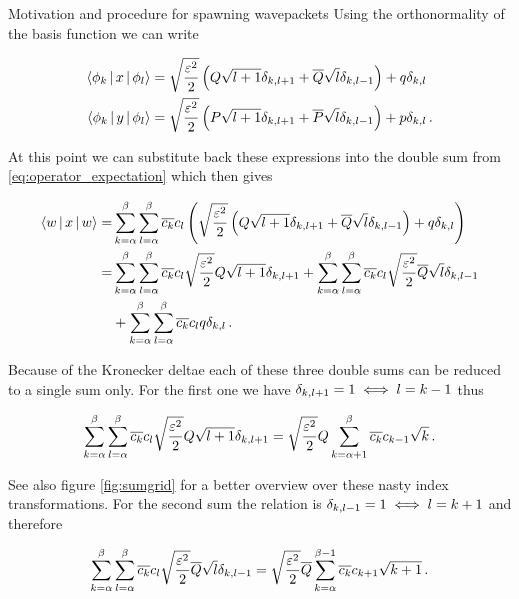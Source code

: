 \begin{chapter}{Motivation and procedure for spawning wavepackets}
Using the orthonormality of the basis function we can write

\begin{align}
  \Braket{\phi_k | x | \phi_l}
  & = \sqrt{\frac{\varepsilon^2}{2}} \left( Q \sqrt{l+1} \delta_{k,l+1}
    + \overline{Q} \sqrt{l} \delta_{k,l-1} \right)
    + q \delta_{k,l} \\
  \Braket{\phi_k | y | \phi_l}
  & = \sqrt{\frac{\varepsilon^2}{2}} \left( P \sqrt{l+1} \delta_{k,l+1}
    + \overline{P} \sqrt{l} \delta_{k,l-1} \right)
    + p \delta_{k,l} \,.
\end{align}

At this point we can substitute back these expressions into the double sum from
\eqref{eq:operator_expectation} which then gives

\begin{equation*}
\begin{split}
  \Braket{w | x | w} = & \sum_{k=\alpha}^\beta \sum_{l=\alpha}^\beta \overline{c_k} c_l
                         \left( \sqrt{\frac{\varepsilon^2}{2}} \left( Q \sqrt{l+1} \delta_{k,l+1}
                         + \overline{Q} \sqrt{l} \delta_{k,l-1} \right) + q \delta_{k,l} \right) \\
  = &   \sum_{k=\alpha}^\beta \sum_{l=\alpha}^\beta \overline{c_k} c_l \sqrt{\frac{\varepsilon^2}{2}} Q \sqrt{l+1} \delta_{k,l+1}
      + \sum_{k=\alpha}^\beta \sum_{l=\alpha}^\beta \overline{c_k} c_l \sqrt{\frac{\varepsilon^2}{2}} \overline{Q} \sqrt{l} \delta_{k,l-1} \\
    & + \sum_{k=\alpha}^\beta \sum_{l=\alpha}^\beta \overline{c_k} c_l q \delta_{k,l} \,.
\end{split}
\end{equation*}

Because of the Kronecker deltae each of these three double sums can be reduced
to a single sum only. For the first one we have $\delta_{k,l+1} = 1 \iff l = k-1$
thus

\begin{equation} \label{eq:part1}
  \sum_{k=\alpha}^\beta \sum_{l=\alpha}^\beta \overline{c_k} c_l \sqrt{\frac{\varepsilon^2}{2}} Q \sqrt{l+1} \delta_{k,l+1}
  = \sqrt{\frac{\varepsilon^2}{2}} Q \sum_{k=\alpha+1}^\beta \overline{c_k} c_{k-1} \sqrt{k} \,.
\end{equation}

See also figure \ref{fig:sumgrid} for a better overview over these nasty index transformations.
For the second sum the relation is $\delta_{k,l-1} = 1 \iff l = k+1$ and therefore

\begin{equation} \label{eq:part2}
  \sum_{k=\alpha}^\beta \sum_{l=\alpha}^\beta \overline{c_k} c_l \sqrt{\frac{\varepsilon^2}{2}} \overline{Q} \sqrt{l} \delta_{k,l-1}
  = \sqrt{\frac{\varepsilon^2}{2}} \overline{Q} \sum_{k=\alpha}^{\beta-1} \overline{c_k} c_{k+1} \sqrt{k+1} \,.
\end{equation}


\end{chapter}
